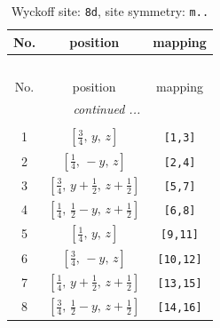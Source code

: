 \documentclass[fleqn,8pt]{jsarticle}
\begin{document}
\begin{longtable}{ccc}
\caption{Wyckoff site: {\tt 8d}, site symmetry: {\tt m..}}
 \\
 \hline \hline
No. & position & mapping \\ \hline \endfirsthead

\multicolumn{2}{l}{\tablename\ \thetable{}} \\
 \hline \hline
No. & position & mapping \\ \hline \endhead

 \hline \hline
\multicolumn{2}{r}{\footnotesize\it continued ...} \\ \endfoot

 \hline \hline
\multicolumn{2}{r}{} \\ \endlastfoot

1 & $\left[ \frac{3}{4},\, y,\, z \right]$ & {\tt [1,3]} \\ \hline
2 & $\left[ \frac{1}{4},\, - y,\, z \right]$ & {\tt [2,4]} \\ \hline
3 & $\left[ \frac{3}{4},\, y + \frac{1}{2},\, z + \frac{1}{2} \right]$ & {\tt [5,7]} \\ \hline
4 & $\left[ \frac{1}{4},\, \frac{1}{2} - y,\, z + \frac{1}{2} \right]$ & {\tt [6,8]} \\ \hline
5 & $\left[ \frac{1}{4},\, y,\, z \right]$ & {\tt [9,11]} \\ \hline
6 & $\left[ \frac{3}{4},\, - y,\, z \right]$ & {\tt [10,12]} \\ \hline
7 & $\left[ \frac{1}{4},\, y + \frac{1}{2},\, z + \frac{1}{2} \right]$ & {\tt [13,15]} \\ \hline
8 & $\left[ \frac{3}{4},\, \frac{1}{2} - y,\, z + \frac{1}{2} \right]$ & {\tt [14,16]} \\
\end{longtable}
\renewcommand{\arraystretch}{1.2}
\end{document}
